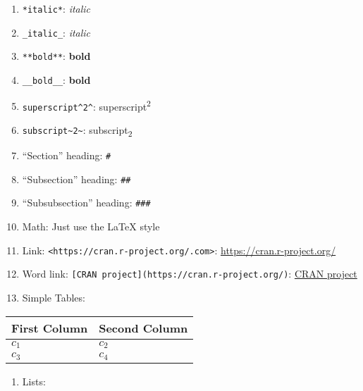 \documentclass[11pt,]{article}
\newenvironment{Shaded}{\begin{snugshade}}{\end{snugshade}}
\newcommand{\DecValTok}[1]{\textcolor[rgb]{0.00,0.00,0.81}{#1}}
\newcommand{\StringTok}[1]{\textcolor[rgb]{0.31,0.60,0.02}{#1}}
\newcommand{\OperatorTok}[1]{\textcolor[rgb]{0.81,0.36,0.00}{\textbf{#1}}}
\newcommand{\ErrorTok}[1]{\textcolor[rgb]{0.64,0.00,0.00}{\textbf{#1}}}
\newcommand{\NormalTok}[1]{#1}
\providecommand{\tightlist}{%
  \setlength{\itemsep}{0pt}\setlength{\parskip}{0pt}}
\begin{document}
\begin{enumerate}
\def\labelenumi{\arabic{enumi}.}
\tightlist
\item
  \texttt{*italic*}: \emph{italic}
\item
  \texttt{\_italic\_}: \emph{italic}
\item
  \texttt{**bold**}: \textbf{bold}
\item
  \texttt{\_\_bold\_\_}: \textbf{bold}
\item
  \texttt{superscript\^{}2\^{}}: superscript\textsuperscript{2}
\item
  \texttt{subscript\textasciitilde{}2\textasciitilde{}}:
  subscript\textsubscript{2}
\item
  ``Section'' heading: \texttt{\#}
\item
  ``Subsection'' heading: \texttt{\#\#}
\item
  ``Subsubsection'' heading: \texttt{\#\#\#}
\item
  Math: Just use the LaTeX style
\item
  Link:
  \texttt{\textless{}https://cran.r-project.org/.com\textgreater{}}:
  \url{https://cran.r-project.org/}
\item
  Word link: \texttt{{[}CRAN\ project{]}(https://cran.r-project.org/)}:
  \href{https://cran.r-project.org/}{CRAN project}
\item
  Simple Tables:
\end{enumerate}

\begin{Shaded}
\end{Shaded}

\begin{longtable}[]{@{}ll@{}}
\toprule
First Column & Second Column\tabularnewline
\midrule
\endhead
\(c_1\) & \(c_2\)\tabularnewline
\(c_3\) & \(c_4\)\tabularnewline
\bottomrule
\end{longtable}

\begin{enumerate}
\def\labelenumi{\arabic{enumi}.}
\setcounter{enumi}{12}
\tightlist
\item
  Lists:
\end{enumerate}
\end{document}

